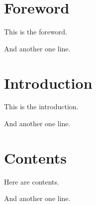 \documentclass{IsoStandardDocument}
\begin{document}
  \section*{Foreword}

  This is the foreword.

  And another one line.

  \section*{Introduction}

  This is the introduction.

  And another one line.

  \section{Contents}
  \lxRDFa[.]{}

  Here are contents.

  And another one line.
\end{document}

